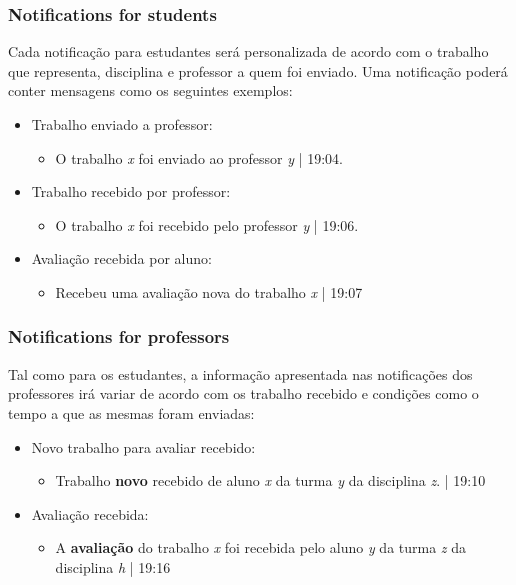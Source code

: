 \documentclass[10pt]{article}
\begin{document}
\subsubsection{Notifications for students}
Cada notificação para estudantes será personalizada de acordo com o trabalho
que representa, disciplina e professor a quem foi enviado.
Uma notificação poderá conter mensagens como os seguintes exemplos:

\begin{itemize}
    \item Trabalho enviado a professor:
        \begin{itemize}
            \item O trabalho \textit{x} foi enviado ao professor \textit{y} | 19:04.
        \end{itemize}
    \item Trabalho recebido por professor:
        \begin{itemize}
            \item O trabalho \textit{x} foi recebido pelo professor \textit{y} | 19:06.
        \end{itemize}
    \item Avaliação recebida por aluno:
        \begin{itemize}
            \item Recebeu uma avaliação nova do trabalho \textit{x} | 19:07
        \end{itemize}
\end{itemize}

\subsubsection{Notifications for professors}
Tal como para os estudantes, a informação apresentada nas notificações
dos professores irá variar de acordo com os trabalho recebido e condições
como o tempo a que as mesmas foram enviadas:
\begin{itemize}
    \item Novo trabalho para avaliar recebido:
        \begin{itemize}
            \item Trabalho \textbf{novo} recebido de aluno \textit{x} da turma \textit{y} da disciplina \textit{z}. | 19:10
        \end{itemize}
    \item Avaliação recebida:
        \begin{itemize}
            \item A \textbf{avaliação} do trabalho \textit{x} foi recebida pelo aluno \textit{y} da turma \textit{z}
                da disciplina \textit{h} | 19:16
        \end{itemize}
\end{itemize}
\end{document}
